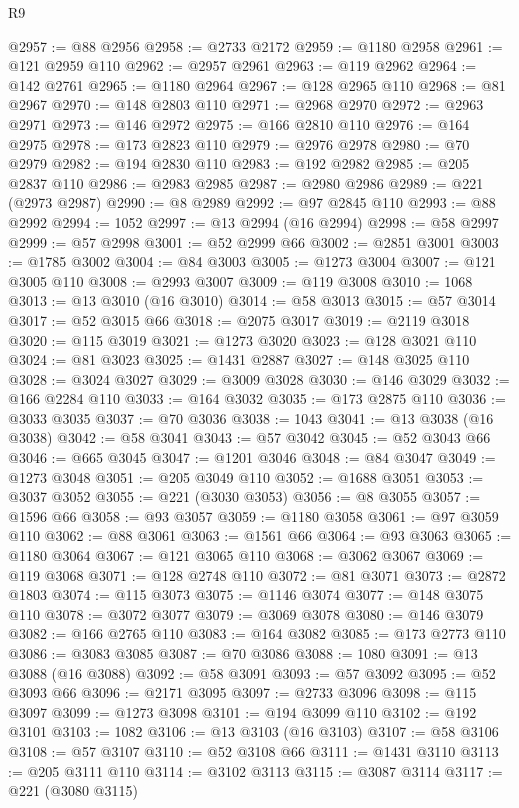 \begin{lexlean}{R9}
\begin{coremodule}
@2957 := @88 @2956
@2958 := @2733 @2172
@2959 := @1180 @2958
@2961 := @121 @2959 @110
@2962 := @2957 @2961
@2963 := @119 @2962
@2964 := @142 @2761
@2965 := @1180 @2964
@2967 := @128 @2965 @110
@2968 := @81 @2967
@2970 := @148 @2803 @110
@2971 := @2968 @2970
@2972 := @2963 @2971
@2973 := @146 @2972
@2975 := @166 @2810 @110
@2976 := @164 @2975
@2978 := @173 @2823 @110
@2979 := @2976 @2978
@2980 := @70 @2979
@2982 := @194 @2830 @110
@2983 := @192 @2982
@2985 := @205 @2837 @110
@2986 := @2983 @2985
@2987 := @2980 @2986
@2989 := @221 (@2973 @2987)
@2990 := @8 @2989
@2992 := @97 @2845 @110
@2993 := @88 @2992
@2994 := 1052
@2997 := @13 @2994 (@16 @2994)
@2998 := @58 @2997
@2999 := @57 @2998
@3001 := @52 @2999 @66
@3002 := @2851 @3001
@3003 := @1785 @3002
@3004 := @84 @3003
@3005 := @1273 @3004
@3007 := @121 @3005 @110
@3008 := @2993 @3007
@3009 := @119 @3008
@3010 := 1068
@3013 := @13 @3010 (@16 @3010)
@3014 := @58 @3013
@3015 := @57 @3014
@3017 := @52 @3015 @66
@3018 := @2075 @3017
@3019 := @2119 @3018
@3020 := @115 @3019
@3021 := @1273 @3020
@3023 := @128 @3021 @110
@3024 := @81 @3023
@3025 := @1431 @2887
@3027 := @148 @3025 @110
@3028 := @3024 @3027
@3029 := @3009 @3028
@3030 := @146 @3029
@3032 := @166 @2284 @110
@3033 := @164 @3032
@3035 := @173 @2875 @110
@3036 := @3033 @3035
@3037 := @70 @3036
@3038 := 1043
@3041 := @13 @3038 (@16 @3038)
@3042 := @58 @3041
@3043 := @57 @3042
@3045 := @52 @3043 @66
@3046 := @665 @3045
@3047 := @1201 @3046
@3048 := @84 @3047
@3049 := @1273 @3048
@3051 := @205 @3049 @110
@3052 := @1688 @3051
@3053 := @3037 @3052
@3055 := @221 (@3030 @3053)
@3056 := @8 @3055
@3057 := @1596 @66
@3058 := @93 @3057
@3059 := @1180 @3058
@3061 := @97 @3059 @110
@3062 := @88 @3061
@3063 := @1561 @66
@3064 := @93 @3063
@3065 := @1180 @3064
@3067 := @121 @3065 @110
@3068 := @3062 @3067
@3069 := @119 @3068
@3071 := @128 @2748 @110
@3072 := @81 @3071
@3073 := @2872 @1803
@3074 := @115 @3073
@3075 := @1146 @3074
@3077 := @148 @3075 @110
@3078 := @3072 @3077
@3079 := @3069 @3078
@3080 := @146 @3079
@3082 := @166 @2765 @110
@3083 := @164 @3082
@3085 := @173 @2773 @110
@3086 := @3083 @3085
@3087 := @70 @3086
@3088 := 1080
@3091 := @13 @3088 (@16 @3088)
@3092 := @58 @3091
@3093 := @57 @3092
@3095 := @52 @3093 @66
@3096 := @2171 @3095
@3097 := @2733 @3096
@3098 := @115 @3097
@3099 := @1273 @3098
@3101 := @194 @3099 @110
@3102 := @192 @3101
@3103 := 1082
@3106 := @13 @3103 (@16 @3103)
@3107 := @58 @3106
@3108 := @57 @3107
@3110 := @52 @3108 @66
@3111 := @1431 @3110
@3113 := @205 @3111 @110
@3114 := @3102 @3113
@3115 := @3087 @3114
@3117 := @221 (@3080 @3115)

\end{coremodule}
\end{lexlean}
